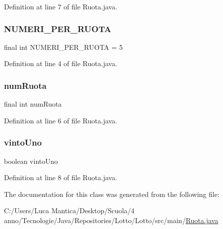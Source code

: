 Definition at line 7 of file Ruota.\+java.

\mbox{\label{classmain_1_1_ruota_a545c7333f82d918fed8d2a5838c334fd}} 
\subsubsection{\texorpdfstring{N\+U\+M\+E\+R\+I\+\_\+\+P\+E\+R\+\_\+\+R\+U\+O\+TA}{NUMERI\_PER\_RUOTA}}
{\footnotesize\ttfamily final int N\+U\+M\+E\+R\+I\+\_\+\+P\+E\+R\+\_\+\+R\+U\+O\+TA = 5\hspace{0.3cm}{\ttfamily [static]}}



Definition at line 4 of file Ruota.\+java.

\mbox{\label{classmain_1_1_ruota_ab7691d77fe75980e207c3c89cf90b7da}} 
\subsubsection{\texorpdfstring{num\+Ruota}{numRuota}}
{\footnotesize\ttfamily final int num\+Ruota\hspace{0.3cm}{\ttfamily [private]}}



Definition at line 6 of file Ruota.\+java.

\mbox{\label{classmain_1_1_ruota_a208227a3e29bd1d579feb423a9948700}} 
\subsubsection{\texorpdfstring{vinto\+Uno}{vintoUno}}
{\footnotesize\ttfamily boolean vinto\+Uno\hspace{0.3cm}{\ttfamily [private]}}



Definition at line 8 of file Ruota.\+java.



The documentation for this class was generated from the following file\+:\begin{DoxyCompactItemize}
\item 
C\+:/\+Users/\+Luca Mantica/\+Desktop/\+Scuola/4 anno/\+Tecnologie/\+Java/\+Repositories/\+Lotto/\+Lotto/src/main/\mbox{\hyperlink{_ruota_8java}{Ruota.\+java}}\end{DoxyCompactItemize}
